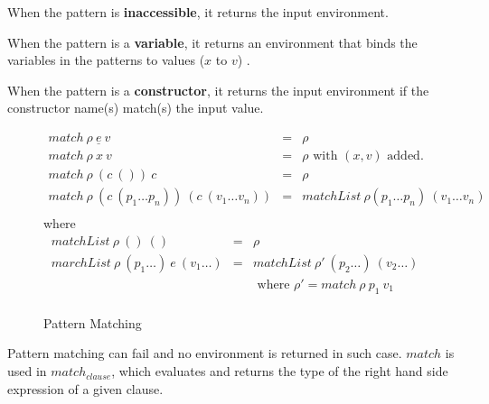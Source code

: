 \documentclass[acmsmall]{acmart}
\begin{document}
When the pattern is \textbf{inaccessible}, it returns the input environment.

When the pattern is a \textbf{variable}, it returns an environment that binds the variables in the patterns to values ($x$ to $v$) .

When the pattern is a \textbf{constructor}, it returns the input environment if the constructor name(s) match(s) the input value.

\begin{figure}[H]
  \begin{equation*}
    \begin{aligned}
      match \: \rho \: \underline{e} \: v                               & = & \rho                                                 \\
      match \: \rho \: x \: v                                           & = & \rho \textrm{ with } (x, v) \textrm{ added.}         \\
      match \: \rho \: (c \: ()) \: c                                   & = & \rho                                                 \\
      match \: \rho \: (c \: (p_1 \dots p_n)) \: (c \: (v_1 \dots v_n)) & = & matchList \: \rho (p_1 \dots p_n) \: (v_1 \dots v_n) \\
    \end{aligned}
  \end{equation*}
  \textrm{ where }
  \begin{equation*}
    \begin{aligned}
      matchList \: \rho \: () \: ()                        & = & \rho                                                                               \\
      marchList \: \rho \: (p_1 \dots) \: e \: (v_1 \dots) & = & matchList \: \rho' \:(p_2 \dots) \: (v_2 \dots)                                    \\
                                                           &   & \textrm{ where } \rho'                               = match \: \rho \: p_1 \: v_1 \\     
    \end{aligned}
  \end{equation*}
  \caption{Pattern Matching}
\end{figure}

Pattern matching can fail and no environment is returned in such case. $match$ is used in $match_{clause}$, which evaluates and returns the type of the right hand side expression of a given clause.
\end{document}
